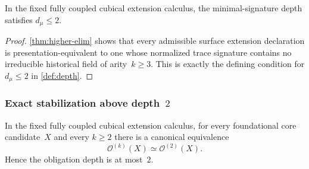 \documentclass{lmcs}
\newcommand{\Ocal}{\mathcal{O}}
\begin{document}
\begin{cor}
\label{cor:dmu2}
In the fixed fully coupled cubical extension calculus, the minimal-signature depth satisfies $d_\mu \leq 2$.
\end{cor}

\begin{proof}
\autoref{thm:higher-elim} shows that every admissible surface extension declaration is presentation-equivalent to one whose normalized trace signature contains no irreducible historical field of arity~$k \geq 3$. This is exactly the defining condition for $d_\mu \leq 2$ in \autoref{def:depth}.
\end{proof}

\subsubsection{\texorpdfstring{Exact stabilization above depth~$2$}{Exact stabilization above depth 2}}

\begin{thm}
\label{thm:upper}
In the fixed fully coupled cubical extension calculus, for every foundational core candidate~$X$ and every $k \geq 2$ there is a canonical equivalence
\[
  \Ocal^{(k)}(X) \simeq \Ocal^{(2)}(X).
\]
Hence the obligation depth is at most~$2$.
\end{thm}
\end{document}

